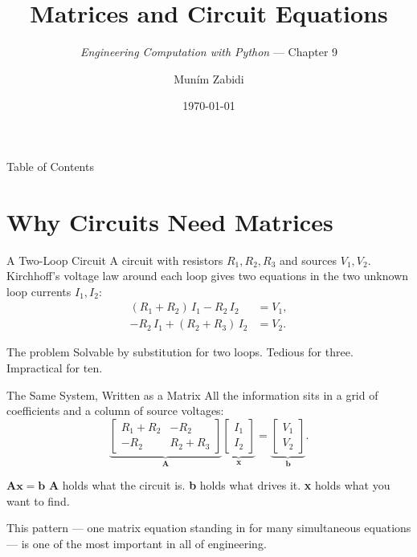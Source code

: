 \documentclass[9pt,aspectratio=169,xcolor=table]{beamer}
\title{Matrices and Circuit Equations}
\subtitle{\emph{Engineering Computation with Python} --- Chapter 9}
\author{Mun\'{i}m Zabidi}
\institute{\color{primary}Faculty of Electrical Engineering, Universiti Teknologi Malaysia}
\date{\today}
\begin{document}
\titlepage

\begin{frame}{Table of Contents}
    \tableofcontents
\end{frame}

\section{Why Circuits Need Matrices}

\begin{frame}{A Two-Loop Circuit}
    \leavevmode
    A circuit with resistors $R_1, R_2, R_3$ and sources $V_1, V_2$.
    Kirchhoff's voltage law around each loop gives two equations in the
    two unknown loop currents $I_1, I_2$:
    \[
    \begin{aligned}
    (R_1 + R_2)\,I_1 - R_2\,I_2 &= V_1, \\
    -R_2\,I_1 + (R_2 + R_3)\,I_2 &= V_2 .
    \end{aligned}
    \]

    \vspace{2mm}
    \begin{alertblock}{The problem}
        Solvable by substitution for two loops. Tedious for three.
        \alert{Impractical} for ten.
    \end{alertblock}
\end{frame}

\begin{frame}{The Same System, Written as a Matrix}
    \leavevmode
    All the information sits in a grid of coefficients and a column of
    source voltages:
    \[
    \underbrace{\begin{bmatrix} R_1 + R_2 & -R_2 \\ -R_2 & R_2 + R_3 \end{bmatrix}}_{\mathbf{A}}
    \underbrace{\begin{bmatrix} I_1 \\ I_2 \end{bmatrix}}_{\mathbf{x}}
    =
    \underbrace{\begin{bmatrix} V_1 \\ V_2 \end{bmatrix}}_{\mathbf{b}} .
    \]

    \vspace{2mm}
    \begin{block}{$\mathbf{A}\mathbf{x} = \mathbf{b}$}
        \textbf{A} holds what the circuit \alert{is}. \textbf{b} holds
        what \alert{drives} it. \textbf{x} holds what you want to
        \alert{find}.
    \end{block}

    \vspace{2mm}
    {\small This pattern --- one matrix equation standing in for many
    simultaneous equations --- is one of the most important in all of
    engineering.}
\end{frame}
\end{document}
